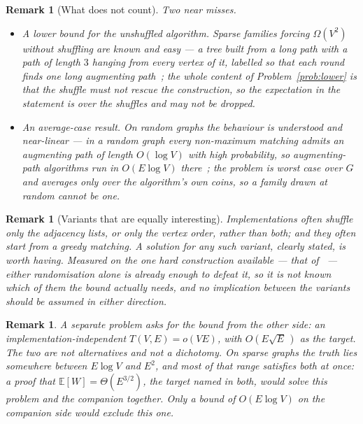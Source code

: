 \documentclass[10pt]{article}
\newtheorem{remark}[theorem]{Remark}
\newcommand{\Ex}{\mathbb{E}}
\begin{document}
\begin{remark}[What does not count]\label{rem:notcount}
Two near misses.
\begin{itemize}
  \item A lower bound for the \emph{unshuffled} algorithm. Sparse families
  forcing $\Omega(V^{2})$ without shuffling are known and easy --- a tree built
  from a long path with a path of length $3$ hanging from every vertex of it,
  labelled so that each round finds one long augmenting
  path~\cite{Dacin21}; the whole content of Problem~\ref{prob:lower} is
  that the shuffle must not rescue the construction, so the expectation in the
  statement is over the shuffles and may not be dropped.
  \item An average-case result. On random graphs the behaviour is understood
  and near-linear --- in a random graph every non-maximum matching admits an
  augmenting path of length $O(\log V)$ with high probability, so
  augmenting-path algorithms run in $O(E\log V)$ there~\cite{BMST06}; the problem is worst case over $G$
  and averages only over the algorithm's own coins, so a family drawn at random
  cannot be one.
\end{itemize}
\end{remark}

\begin{remark}[Variants that are equally interesting]\label{rem:variants}
Implementations often shuffle only the adjacency lists, or only the vertex
order, rather than both; and they often start from a greedy matching. A
solution for any such variant, clearly stated, is worth having.
Measured on the one hard construction available --- that of~\cite{Dacin21} ---
either randomisation alone is already enough to defeat it, so it is not known
which of them the bound actually needs, and no implication between the variants
should be assumed in either direction.
\end{remark}

\begin{remark}\label{rem:dichotomy}
A separate problem asks for the bound from
the other side: an implementation-independent $T(V,E)=o(VE)$, with
$O(E\sqrt E\,)$ as the target. The two are not alternatives and not a
dichotomy. On sparse graphs the truth lies somewhere between $E\log V$ and
$E^{2}$, and most of that range satisfies both at once: a proof that
$\Ex[W]=\Theta(E^{3/2})$, the target named in both, would solve this problem and
the companion together. Only a bound of $O(E\log V)$ on the companion side would
exclude this one.
\end{remark}
\end{document}
